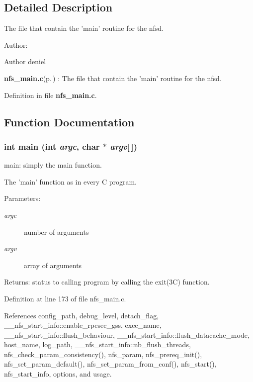 \subsection{Detailed Description}
The file that contain the 'main' routine for the nfsd. 

\begin{Desc}
\item[Author:]\begin{Desc}
\item[Author]deniel \end{Desc}
\end{Desc}
{\bf nfs\_\-main.c}{\rm (p.\,\pageref{nfs__main_8c})} : The file that contain the 'main' routine for the nfsd.

Definition in file {\bf nfs\_\-main.c}.

\subsection{Function Documentation}
\subsubsection{\setlength{\rightskip}{0pt plus 5cm}int main (int {\em argc}, char $\ast$ {\em argv}[$\,$])}\label{nfs__main_8c_a10}


main: simply the main function.

The 'main' function as in every C program.

\begin{Desc}
\item[Parameters:]
\begin{description}
\item[{\em argc}]number of arguments \item[{\em argv}]array of arguments\end{description}
\end{Desc}
\begin{Desc}
\item[Returns:]status to calling program by calling the exit(3C) function. \end{Desc}


Definition at line 173 of file nfs\_\-main.c.

References config\_\-path, debug\_\-level, detach\_\-flag, \_\-\_\-nfs\_\-start\_\-info::enable\_\-rpcsec\_\-gss, exec\_\-name, \_\-\_\-nfs\_\-start\_\-info::flush\_\-behaviour, \_\-\_\-nfs\_\-start\_\-info::flush\_\-datacache\_\-mode, host\_\-name, log\_\-path, \_\-\_\-nfs\_\-start\_\-info::nb\_\-flush\_\-threads, nfs\_\-check\_\-param\_\-consistency(), nfs\_\-param, nfs\_\-prereq\_\-init(), nfs\_\-set\_\-param\_\-default(), nfs\_\-set\_\-param\_\-from\_\-conf(), nfs\_\-start(), nfs\_\-start\_\-info, options, and usage.

